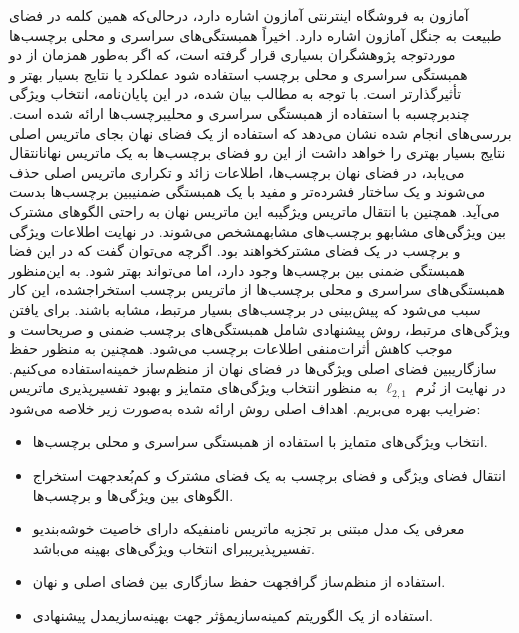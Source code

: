 آمازون به فروشگاه اینترنتی آمازون اشاره دارد، درحالی‌که همین کلمه در فضای طبیعت به جنگل آمازون اشاره دارد. اخیراً همبستگی‌های سراسری و محلی برچسب‌ها موردتوجه پژوهشگران بسیاری قرار گرفته است، که اگر به‌طور همزمان از دو همبستگی سراسری و محلی برچسب استفاده شود عملکرد یا نتایج بسیار بهتر و تأثیرگذارتر است. با توجه به مطالب بیان شده، در این پایان‌نامه، انتخاب ویژگی چندبرچسبه با استفاده از همبستگی سراسری و محلیبرچسب‌ها ارائه شده است. 
بررسی‌های انجام شده نشان ‌می‌دهد که استفاده از یک فضای نهان بجای ماتریس اصلی نتایج بسیار بهتری را خواهد داشت از این رو فضای برچسب‌ها به یک ماتریس نهانانتقال می‌یابد، در فضای نهان برچسب‌ها، اطلاعات زائد و تکراری ماتریس اصلی حذف می‌شوند و یک ساختار فشرده‌تر و مفید با یک همبستگی ضمنیبین برچسب‌ها بدست می‌آید. 
همچنین با انتقال ماتریس ویژگیبه این ماتریس نهان به راحتی الگو‌های مشترک بین ویژگی‌های مشابهو برچسب‌های مشابهمشخص ‌می‌شوند. در نهایت اطلاعات ویژگی و برچسب در یک فضای مشترکخواهند ‌بود. 
اگرچه می‌توان گفت که در این فضا همبستگی ضمنی بین برچسب‌ها وجود دارد، اما می‌تواند بهتر شود. به این‌منظور همبستگی‌های سراسری و محلی برچسب‌ها از ماتریس برچسب استخراجشده، این کار سبب می‌شود که پیش‌بینی در برچسب‌های بسیار مرتبط، مشابه باشند. برای یافتن ویژگی‌های مرتبط، روش پیشنهادی شامل همبستگی‌های برچسب ضمنی و صریحاست و موجب کاهش أثرات‌منفی اطلاعات برچسب می‌شود. همچنین به منظور حفظ سازگاریبین فضای اصلی ویژگی‌ها در فضای نهان از منظم‌ساز خمینه‌استفاده می‌کنیم. در نهایت از نُرم $\ell_{2,1} $ به منظور انتخاب ویژگی‌های متمایز و بهبود تفسیرپذیری ماتریس ضرایب بهره می‌بریم. 
اهداف اصلی روش ارائه‌ شده به‌صورت زیر خلاصه می‌شود:

\begin{itemize}
	\item  انتخاب ویژگی‌های متمایز با استفاده از همبستگی سراسری و محلی برچسب‌ها.
	\item انتقال فضای ویژگی و فضای برچسب به یک فضای مشترک و کم‌بُعدجهت استخراج الگوهای بین ویژگی‌ها و برچسب‌ها.
	\item معرفی یک مدل مبتنی بر تجزیه ماتریس نامنفیکه دارای خاصیت خوشه‌بندیو تفسیرپذیریبرای انتخاب ویژگی‌های بهینه می‌باشد.
	\item استفاده از منظم‌ساز گرافجهت حفظ سازگاری بین فضای اصلی و نهان.
	\item استفاده از یک الگوریتم کمینه‌سازیمؤثر جهت بهینه‌سازیمدل پیشنهادی.
	
\end{itemize}



